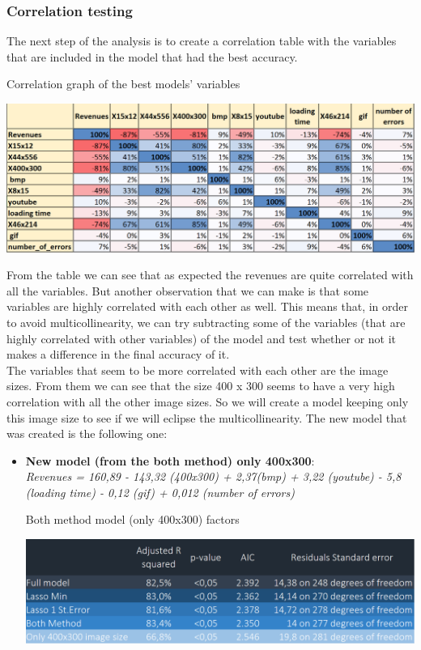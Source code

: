 \documentclass{book}
\begin{document}
\subsubsection{Correlation testing}
The next step of the analysis is to create a correlation table with the variables that are included in the model that had the best accuracy.\\
\begin{table}[H]
\centering
\caption{Correlation graph of the best models' variables}
\begin{center}
\includegraphics[scale=0.5]{../R/photos/86_model_cor_2.png}     \\
\end{center}
\end{table}
From the table we can see that as expected the revenues are quite correlated with all the variables. But another observation that we can make is that some variables are highly correlated with each other as well. This means that, in order to avoid multicollinearity, we can try subtracting some of the variables (that are highly correlated with other variables) of the model and test whether or not it makes a difference in the final accuracy of it.\\
The variables that seem to be more correlated with each other are the image sizes. From them we can see that the size 400 x 300 seems to have a very high correlation with all the other image sizes. So we will create a model keeping only this image size to see if we will eclipse the multicollinearity. The new model that was created is the following one:
\begin{itemize}
\item \textbf{New model (from the both method) only 400x300}:\\
\textit{Revenues = 160,89 - 143,32 (400x300) + 2,37(bmp) + 3,22 (youtube) - 5,8 (loading time) - 0,12 (gif) + 0,012 (number of errors)}
\begin{table}[H]
\centering
\caption{Both method model (only 400x300) factors}
\includegraphics[scale=0.6]{../R/photos/0001_f_f3_f4_ma_f5.PNG} 
\end{table}
\end{itemize}
\end{document}
